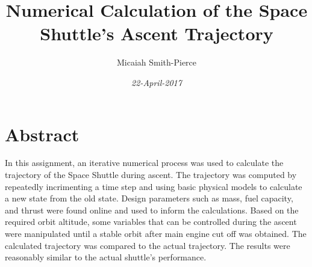 \documentclass{article}
\title{Numerical Calculation of the Space Shuttle's Ascent Trajectory}
\author{Micaiah Smith-Pierce}
\date{\it{22-April-2017}}
\begin{document}
\maketitle

\section{Abstract}

In this assignment, an iterative numerical process was used to calculate the trajectory of the Space Shuttle during ascent.
The trajectory was computed
by repeatedly incrimenting a time step and using basic physical models to calculate a new state from the old state. Design parameters
such as mass, fuel capacity, and thrust were found online and used to inform the calculations. Based on the required orbit altitude, some variables
that can be controlled during the ascent were manipulated until a stable orbit after main engine cut off was obtained. The calculated trajectory
was compared to the actual trajectory. The results were reasonably similar to the actual shuttle's performance.
\end{document}
